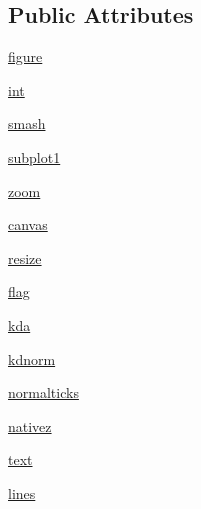 \subsection*{Public Attributes}
\begin{DoxyCompactItemize}
\item 
\hyperlink{class_uni_dec_1_1unidec__modules_1_1_plotting_window_1_1_plotting_window_a3105b6af48c92f39de8e667c4375cbcc}{figure}
\item 
\hyperlink{class_uni_dec_1_1unidec__modules_1_1_plotting_window_1_1_plotting_window_a6019a14255a6ad91f62bef3947d1d7aa}{int}
\item 
\hyperlink{class_uni_dec_1_1unidec__modules_1_1_plotting_window_1_1_plotting_window_a681c7de58de9330f5c726e4c853c51af}{smash}
\item 
\hyperlink{class_uni_dec_1_1unidec__modules_1_1_plotting_window_1_1_plotting_window_aea57aeebc2f64f96c2932b79ed4a3fe8}{subplot1}
\item 
\hyperlink{class_uni_dec_1_1unidec__modules_1_1_plotting_window_1_1_plotting_window_afa368ae8c91913df4d9af81d0ef285a1}{zoom}
\item 
\hyperlink{class_uni_dec_1_1unidec__modules_1_1_plotting_window_1_1_plotting_window_a6bdc4558426f21f6f0efc10c3a7416c6}{canvas}
\item 
\hyperlink{class_uni_dec_1_1unidec__modules_1_1_plotting_window_1_1_plotting_window_afd8e25b2110eddf065964dbebe54c29a}{resize}
\item 
\hyperlink{class_uni_dec_1_1unidec__modules_1_1_plotting_window_1_1_plotting_window_ae618928545b6ff16e0e646a0322c214e}{flag}
\item 
\hyperlink{class_uni_dec_1_1unidec__modules_1_1_plotting_window_1_1_plotting_window_a26b026534ce1fad760609e5fdf05cc7c}{kda}
\item 
\hyperlink{class_uni_dec_1_1unidec__modules_1_1_plotting_window_1_1_plotting_window_a9349831383dce733f3423571e4a93e9b}{kdnorm}
\item 
\hyperlink{class_uni_dec_1_1unidec__modules_1_1_plotting_window_1_1_plotting_window_adf801986eed173b50f0f73d58eeafbbb}{normalticks}
\item 
\hyperlink{class_uni_dec_1_1unidec__modules_1_1_plotting_window_1_1_plotting_window_a19daf87eac7934bead0bcb4203cbf564}{nativez}
\item 
\hyperlink{class_uni_dec_1_1unidec__modules_1_1_plotting_window_1_1_plotting_window_a194ea8e32368e19b3e0c3ccbffca2962}{text}
\item 
\hyperlink{class_uni_dec_1_1unidec__modules_1_1_plotting_window_1_1_plotting_window_a3f6fb87cd4954ef33e09a4551f840c39}{lines}

\end{DoxyCompactItemize}
